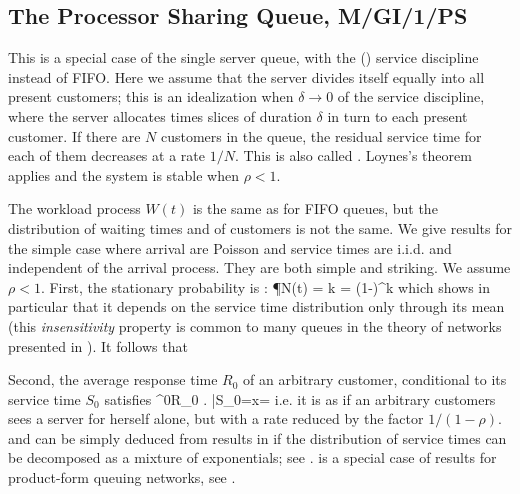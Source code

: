 

\subsection{The Processor Sharing Queue, M/GI/1/PS}
\label{sec-q-ps} This is a special case of the
single server queue, with the  () service discipline instead of
FIFO. Here we assume that the server divides
itself equally into all present customers; this
is an idealization when $\delta \to 0$ of the
 service discipline, where the
server allocates times slices of duration
$\delta$ in turn to each present customer. If
there are $N$ customers in the queue, the
residual service time for each of them decreases
at a rate $1/N$. This is also called
. Loynes's
theorem applies and the system is stable when
$\rho <1$.

The workload process $W(t)$ is the same as for FIFO queues, but
the distribution of waiting times and of customers is not the
same. We give results for the simple case where arrival are
Poisson and service times are i.i.d. and independent of the
arrival process. They are both simple and striking. We assume
$\rho <1$. First, the stationary probability is
\cite{sakata1969analysis}:
 \be
 \P\lp N(t) = k \rp = (1-\rho)\rho^k
 \label{eq-q-ps-q1}
 \ee
 which shows in particular that it depends on the
 service time distribution only through its mean
 (this \emph{insensitivity} property is common to
 many queues in
the theory of networks presented in
).
 It follows that
  \be
  \label{eq-mg1-ps1}
  \ee

Second, the average response time $R_0$ of an
arbitrary customer, conditional to its service
time $S_0$ satisfies \cite{kleinrock-75-b}
 \be
 \E^0\lp R_0 \right. \left|S_0=x\rp=
 \label{eq-mg1-ps2}
 \ee
i.e. it is as if an arbitrary customers sees a server for
herself alone, but with a rate reduced by the factor
$1/(1-\rho)$.  and  can be
simply deduced from results in  if the
distribution of service times can be decomposed as a mixture of
exponentials; see \cite{van1991them}.  is a
special case of results for product-form queuing networks, see
.

